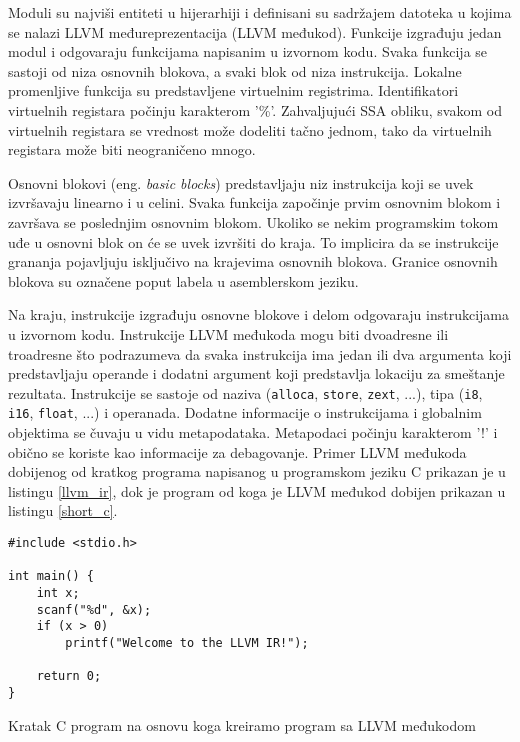 \documentclass[12pt,oneside]{memoir}
\begin{document}
Moduli su najviši entiteti u hijerarhiji i definisani su sadržajem datoteka u kojima se nalazi LLVM međureprezentacija (LLVM međukod). Funkcije izgrađuju jedan modul i odgovaraju funkcijama napisanim u izvornom kodu. Svaka funkcija se sastoji od niza osnovnih blokova, a svaki blok od niza instrukcija. Lokalne promenljive funkcija su predstavljene virtuelnim registrima. Identifikatori virtuelnih registara počinju karakterom ’\%’. Zahvaljujući SSA obliku, svakom od virtuelnih registara se vrednost može dodeliti tačno jednom, tako da virtuelnih registara može biti neograničeno mnogo.

Osnovni blokovi (eng. \textit{basic blocks}) predstavljaju niz instrukcija koji se uvek izvršavaju linearno i u celini. Svaka funkcija započinje prvim osnovnim blokom i završava se poslednjim osnovnim blokom. Ukoliko se nekim programskim tokom uđe u osnovni blok on će se uvek izvršiti do kraja. To implicira da se instrukcije grananja pojavljuju isključivo na krajevima osnovnih blokova. Granice osnovnih blokova su označene poput labela u asemblerskom jeziku.

Na kraju, instrukcije izgrađuju osnovne blokove i delom odgovaraju instrukcijama u izvornom kodu. Instrukcije LLVM međukoda mogu biti dvoadresne ili troadresne što podrazumeva da svaka instrukcija ima jedan ili dva argumenta koji predstavljaju operande i dodatni argument koji predstavlja lokaciju za smeštanje rezultata. 
Instrukcije se sastoje od naziva (\texttt{alloca}, \texttt{store}, \texttt{zext}, ...), tipa (\texttt{i8}, \texttt{i16}, \texttt{float}, ...) i operanada. Dodatne informacije o instrukcijama i globalnim objektima se čuvaju u vidu metapodataka. Metapodaci počinju karakterom ’!’ i obično se koriste kao informacije za debagovanje. Primer LLVM međukoda dobijenog od kratkog programa napisanog u programskom jeziku C prikazan je u listingu \ref{llvm_ir}, dok je program od koga je LLVM međukod dobijen prikazan u 
listingu \ref{short_c}. 

\begin{listing}
\begin{verbatim}
#include <stdio.h>

int main() {
    int x;
    scanf("%d", &x);
    if (x > 0)
        printf("Welcome to the LLVM IR!");
    
    return 0;
}
\end{verbatim}
\caption{Kratak C program na osnovu koga kreiramo program sa LLVM međukodom}
\label{short_c}
\end{listing}
\end{document}
